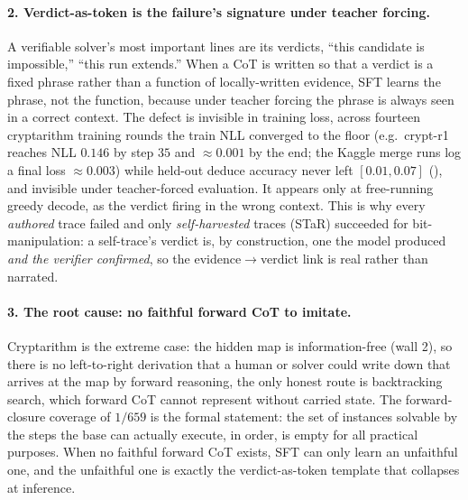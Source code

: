 \documentclass[11pt]{article}
\begin{document}
\paragraph{2. Verdict-as-token is the failure's signature under teacher forcing.} A
verifiable solver's most important lines are its verdicts, ``this candidate is impossible,''
``this run extends.'' When a CoT is written so that a verdict is a fixed phrase rather than a
function of locally-written evidence, SFT learns the phrase, not the function, because under
teacher forcing the phrase is always seen in a correct context. The defect is invisible in
training loss, across fourteen cryptarithm training rounds the train NLL converged to the
floor (e.g.\ crypt-r1 reaches NLL $0.146$ by step $35$ and $\approx\!0.001$ by the end; the
Kaggle merge runs log a final loss $\approx\!0.003$) while held-out deduce accuracy never
left $[0.01,0.07]$ (), and invisible under teacher-forced evaluation. It appears only at free-running
greedy decode, as the verdict firing in the wrong context. This is why every \emph{authored}
trace failed and only \emph{self-harvested} traces (STaR) succeeded for bit-manipulation:
a self-trace's verdict is, by construction, one the model produced \emph{and the verifier
confirmed}, so the evidence$\to$verdict link is real rather than narrated.

\paragraph{3. The root cause: no faithful forward CoT to imitate.} Cryptarithm
is the extreme case: the hidden map is information-free (wall 2), so there is no
left-to-right derivation that a human or solver could write down that arrives at the map by
forward reasoning, the only honest route is backtracking search, which forward CoT cannot
represent without carried state. The forward-closure coverage of $1/659$ is the formal
statement: the set of instances solvable by the steps the base can actually execute,
in order, is empty for all practical purposes. When no faithful forward CoT exists, SFT can
only learn an unfaithful one, and the unfaithful one is exactly the verdict-as-token
template that collapses at inference.
\end{document}
